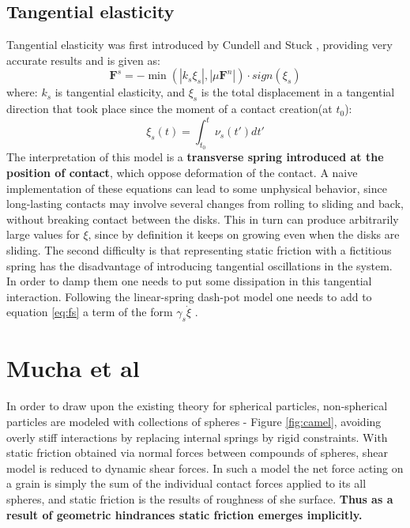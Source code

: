\documentclass[10pt,a4paper]{article}
\begin{document}
\subsection{Tangential elasticity}
Tangential elasticity was first introduced by Cundell and Stuck \cite{cs79}, providing very accurate results and is given as:
\begin{equation} \label{eq:fs}
 \mathbf{F}^s = -\min(|k_s \xi_s|,|\mu \mathbf{F}^n|) \cdot sign(\xi_s)
\end{equation}
where: $k_s$ is tangential elasticity, and $\xi_s$ is the total displacement in a tangential direction that took place
since the moment of a contact creation(at $t_0$):
\begin{equation}
 \xi_s(t) = \int^{t}_{t_0} \nu_s(t')dt'
\end{equation}
The interpretation of this model is a \textbf{transverse spring introduced at the position of contact}, which oppose deformation of the contact.
A naive implementation of these equations can lead to some unphysical behavior,
since long-lasting contacts may involve several changes from rolling to sliding and
back, without breaking contact between the disks. This in turn can produce arbitrarily large values for $\xi$, 
since by definition it keeps on growing even when the
disks are sliding. 
The second difficulty is that representing static friction with a fictitious spring has the disadvantage 
of introducing tangential oscillations in the
system. In order to damp them one needs to put some dissipation in this tangential
interaction. Following the linear-spring dash-pot model one needs to add to equation \ref{eq:fs}
a term of the form $\gamma_s \dot{\xi}$ \cite{perez}.


\section{Mucha et al \cite{mucha05}}
In order to draw upon the existing theory for spherical particles, non-spherical particles are modeled with collections of spheres - Figure \ref{fig:camel}, 
avoiding overly stiff interactions by replacing internal springs by rigid constraints. 
With static friction obtained via normal forces between compounds of spheres, shear model is reduced to dynamic shear forces.
In such a model the net force acting on a grain is simply the sum of the individual contact forces applied to its all spheres,
and static friction is the results of roughness of she surface. \textbf{Thus as a result of geometric hindrances static friction emerges implicitly.}
\end{document}

